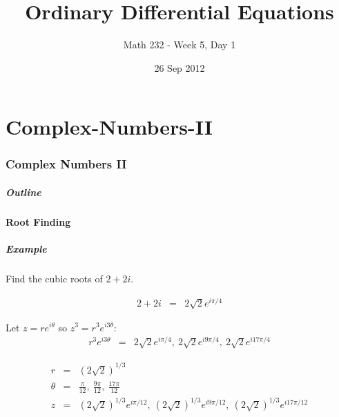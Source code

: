 \part{Complex-Numbers-II}
\section{Complex Numbers II}

\title{Ordinary Differential Equations}
\subtitle{Math 232 - Week 5, Day 1}
\date{26 Sep 2012}

\begin{frame}
  \titlepage
\end{frame}

\begin{frame}
  \frametitle{Outline}
\end{frame}


\subsection{Root Finding}


\begin{frame}
  \frametitle{Example}

  Find the cubic roots of $2+2i$.

  \begin{eqnarray*}
    2 + 2i & = & 2\sqrt{2} e^{i\pi/4}
  \end{eqnarray*}

  Let $z=re^{i\theta}$ so $z^3=r^3e^{i3\theta}$:
  \begin{eqnarray*}
    r^3e^{i3\theta} & = & 2\sqrt{2} e^{i\pi/4}, ~ 2\sqrt{2} e^{i9\pi/4}, ~ 2\sqrt{2} e^{i17\pi/4}
  \end{eqnarray*}

  \begin{eqnarray*}
    r &  = & (2\sqrt{2})^{1/3} \\
    \theta & = & \frac{\pi}{12}, ~ \frac{9\pi}{12}, ~ \frac{17\pi}{12} \\
    z & = &  (2\sqrt{2})^{1/3} e^{i\pi/12}, ~ (2\sqrt{2})^{1/3} e^{i9\pi/12}, ~ (2\sqrt{2})^{1/3} e^{i17\pi/12}
  \end{eqnarray*}

\end{frame}


